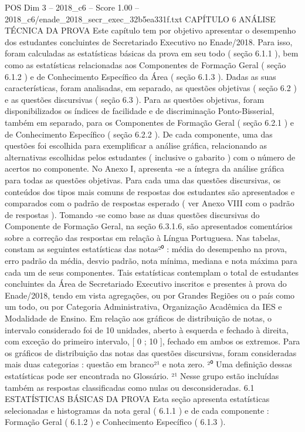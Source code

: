 \begin{textsample}{POS Dim 3 – 2018\_c6 – Score 1.00 – 2018\_c6/enade\_2018\_secr\_exec\_32b5ea331f.txt}  \label{ex:f3_pos_117}
CAPÍTULO 6 ANÁLISE TÉCNICA DA PROVA Este capítulo tem por objetivo apresentar o desempenho dos estudantes concluintes de Secretariado Executivo no Enade/2018.
Para isso, foram calculadas as estatísticas básicas da prova em seu todo ( seção 6.1.1 ), bem como as estatísticas relacionadas aos Componentes de Formação Geral ( seção 6.1.2 ) e de Conhecimento Específico da Área ( seção 6.1.3 ).
Dadas as suas características, foram analisadas, em separado, as questões objetivas ( seção 6.2 ) e as questões discursivas ( seção 6.3 ).
Para as questões objetivas, foram disponibilizados os índices de facilidade e de discriminação Ponto-Bisserial, também em separado, para os Componentes de Formação Geral ( seção 6.2.1 ) e de Conhecimento Específico ( seção 6.2.2 ).
De cada componente, uma das questões foi escolhida para exemplificar a análise gráfica, relacionando as alternativas escolhidas pelos estudantes ( inclusive o gabarito ) com o número de acertos no componente.
No Anexo I, apresenta -se a íntegra da análise gráfica para todas as questões objetivas.
Para cada uma das questões discursivas, os conteúdos dos tipos mais comuns de respostas dos estudantes são apresentados e comparados com o padrão de respostas esperado ( ver Anexo VIII com o padrão de respostas ).
Tomando -se como base as duas questões discursivas do Componente de Formação Geral, na seção 6.3.1.6, são apresentados comentários sobre a correção das respostas em relação à Língua Portuguesa.
Nas tabelas, constam as seguintes estatísticas das notas²⁰ : média do desempenho na prova, erro padrão da média, desvio padrão, nota mínima, mediana e nota máxima para cada um de seus componentes.
Tais estatísticas contemplam o total de estudantes concluintes da Área de Secretariado Executivo inscritos e presentes à prova do Enade/2018, tendo em vista agregações, ou por Grandes Regiões ou o país como um todo, ou por Categoria Administrativa, Organização Acadêmica da IES e Modalidade de Ensino.
Em relação aos gráficos de distribuição de notas, o intervalo considerado foi de 10 unidades, aberto à esquerda e fechado à direita, com exceção do primeiro intervalo, [ 0 ; 10 ], fechado em ambos os extremos.
Para os gráficos de distribuição das notas das questões discursivas, foram consideradas mais duas categorias : questão em branco²¹ e nota zero. ²⁰ Uma definição dessas estatísticas pode ser encontrada no Glossário. ²¹ Nesse grupo estão incluídas também as respostas classificadas como nulas ou desconsideradas. 6.1 ESTATÍSTICAS BÁSICAS DA PROVA Esta seção apresenta estatísticas selecionadas e histogramas da nota geral ( 6.1.1 ) e de cada componente : Formação Geral ( 6.1.2 ) e Conhecimento Específico ( 6.1.3 ).

\end{textsample}
